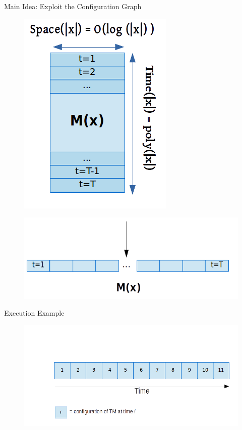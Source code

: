 \begin{frame}{Main Idea: Exploit the Configuration Graph}
	
	\begin{figure}
		\includegraphics[scale=0.5]{pics/tm-rectangle.png}
	\end{figure}
	\begin{figure}
		\includegraphics[scale=0.5]{pics/tm-lin.png}
	\end{figure}
\end{frame}

\begin{frame}{Execution Example}
	\begin{figure}
		\includegraphics[scale=0.4]{pics/r0.png}
	\end{figure}
\end{frame}

